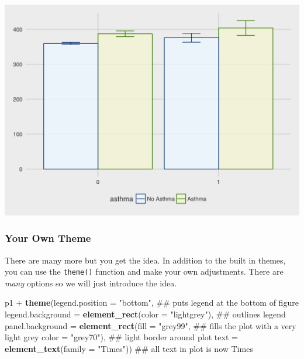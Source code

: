 \documentclass[]{tufte-book}
\newenvironment{Shaded}{}{}
\newcommand{\KeywordTok}[1]{\textcolor[rgb]{0.00,0.44,0.13}{\textbf{#1}}}
\newcommand{\DataTypeTok}[1]{\textcolor[rgb]{0.56,0.13,0.00}{#1}}
\newcommand{\StringTok}[1]{\textcolor[rgb]{0.25,0.44,0.63}{#1}}
\newcommand{\OperatorTok}[1]{\textcolor[rgb]{0.40,0.40,0.40}{#1}}
\newcommand{\NormalTok}[1]{#1}
\theoremstyle{definition}
\theoremstyle{definition}
\theoremstyle{remark}
\begin{document}
\includegraphics{_main_files/figure-latex/unnamed-chunk-151-1}

\subsubsection*{Your Own Theme}\label{your-own-theme}

There are many more but you get the idea. In addition to the built in
themes, you can use the \texttt{theme()} function and make your own
adjustments. There are \emph{many} options so we will just introduce the
idea.

\begin{Shaded}
\begin{Highlighting}[]
\NormalTok{p1 }\OperatorTok{+}\StringTok{ }
\StringTok{  }\KeywordTok{theme}\NormalTok{(}\DataTypeTok{legend.position =} \StringTok{"bottom"}\NormalTok{,  ## puts legend at the bottom of figure}
        \DataTypeTok{legend.background =} \KeywordTok{element_rect}\NormalTok{(}\DataTypeTok{color =} \StringTok{"lightgrey"}\NormalTok{),  ## outlines legend}
        \DataTypeTok{panel.background =} \KeywordTok{element_rect}\NormalTok{(}\DataTypeTok{fill =} \StringTok{"grey99"}\NormalTok{,   ## fills the plot with a very light grey}
                                        \DataTypeTok{color =} \StringTok{"grey70"}\NormalTok{),  ## light border around plot}
        \DataTypeTok{text =} \KeywordTok{element_text}\NormalTok{(}\DataTypeTok{family =} \StringTok{"Times"}\NormalTok{))     ## all text in plot is now Times}
\end{Highlighting}
\end{Shaded}
\end{document}
